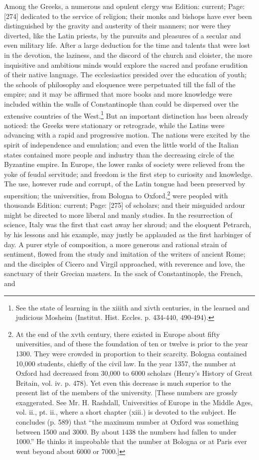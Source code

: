 Among the Greeks, a numerous and opulent clergy was Edition: current; Page: [274] dedicated to the service of religion; their monks and bishops have ever been distinguished by the gravity and austerity of their manners; nor were they diverted, like the Latin priests, by the pursuits and pleasures of a secular and even military life. After a large deduction for the time and talents that were lost in the devotion, the laziness, and the discord of the church and cloister, the more inquisitive and ambitious minds would explore the sacred and profane erudition of their native language. The ecclesiastics presided over the education of youth; the schools of philosophy and eloquence were perpetuated till the fall of the empire; and it may be affirmed that more books and more knowledge were included within the walls of Constantinople than could be dispersed over the extensive countries of the West.\footnote{See the state of learning in the xiiith and xivth centuries, in the learned and judicious Mosheim (Institut. Hist. Eccles. p. 434-440, 490-494).} But an important distinction has been already noticed: the Greeks were stationary or retrograde, while the Latins were advancing with a rapid and progressive motion. The nations were excited by the spirit of independence and emulation; and even the little world of the Italian states contained more people and industry than the decreasing circle of the Byzantine empire. In Europe, the lower ranks of society were relieved from the yoke of feudal servitude; and freedom is the first step to curiosity and knowledge. The use, however rude and corrupt, of the Latin tongue had been preserved by supersition; the universities, from Bologna to Oxford,\footnote{At the end of the xvth century, there existed in Europe about fifty universities, and of these the foundation of ten or twelve is prior to the year 1300. They were crowded in proportion to their scarcity. Bologna contained 10,000 students, chiefly of the civil law. In the year 1357, the number at Oxford had decreased from 30,000 to 6000 scholars (Henry\texthebrew{}’s History of Great Britain, vol. iv. p. 478). Yet even this decrease is much superior to the present list of the members of the university. [These numbers are grossly exaggerated. See Mr. H. Rashdall, Universities of Europe in the Middle Ages, vol. ii., pt. ii., where a short chapter (xiii.) is devoted to the subject. He concludes (p. 589) that \texthebrew{“}the maximum number at Oxford was something between 1500 and 3000. By about 1438 the numbers had fallen to under 1000.\texthebrew{}” He thinks it improbable that the number at Bologna or at Paris ever went beyond about 6000 or 7000.]} were peopled with thousands Edition: current; Page: [275] of scholars; and their misguided ardour might be directed to more liberal and manly studies. In the resurrection of science, Italy was the first that cast away her shroud; and the eloquent Petrarch, by his lessons and his example, may justly be applauded as the first harbinger of day. A purer style of composition, a more generous and rational strain of sentiment, flowed from the study and imitation of the writers of ancient Rome; and the disciples of Cicero and Virgil approached, with reverence and love, the sanctuary of their Grecian masters. In the sack of Constantinople, the French, and 